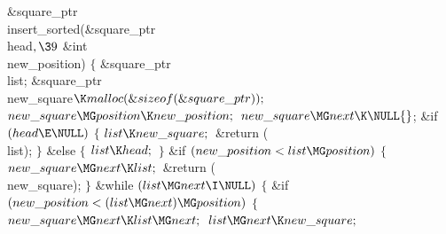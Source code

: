 \Y\B\&{square\_ptr} \\{insert\_sorted}(\&{square\_ptr} \\{head}${},\39{}$%
\&{int} \\{new\_position})\1\1\2\2\6
${}\{{}$\1\6
\&{square\_ptr} \\{list};\6
\&{square\_ptr} \\{new\_square}${}\K\\{malloc}(\&{sizeof}(\&{square\_ptr}));{}$%
\7
${}\\{new\_square}\MG\\{position}\K\\{new\_position};{}$\6
${}\\{new\_square}\MG\\{next}\K\NULL{}$;\6
\&{if} ${}(\\{head}\E\NULL){}$\5
${}\{{}$\1\6
${}\\{list}\K\\{new\_square};{}$\6
\&{return} (\\{list});\6
\4${}\}{}$\2\6
\&{else}\5
${}\{{}$\1\6
${}\\{list}\K\\{head};{}$\6
\4${}\}{}$\2\6
\&{if} ${}(\\{new\_position}<\\{list}\MG\\{position}){}$\5
${}\{{}$\1\6
${}\\{new\_square}\MG\\{next}\K\\{list};{}$\6
\&{return} (\\{new\_square});\6
\4${}\}{}$\2\6
\&{while} ${}(\\{list}\MG\\{next}\I\NULL){}$\5
${}\{{}$\1\6
\&{if} ${}(\\{new\_position}<(\\{list}\MG\\{next})\MG\\{position}){}$\5
${}\{{}$\1\6
${}\\{new\_square}\MG\\{next}\K\\{list}\MG\\{next};{}$\6
${}\\{list}\MG\\{next}\K\\{new\_square};{}$\6
